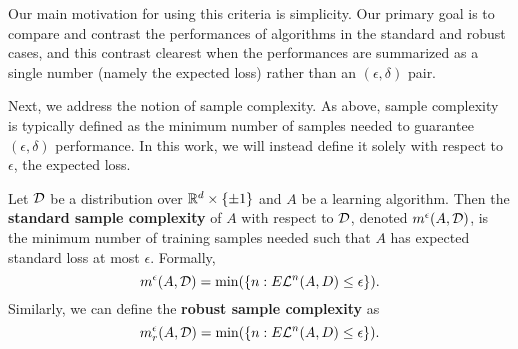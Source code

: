 Our main motivation for using this criteria is simplicity. Our primary goal is to compare and contrast the performances of algorithms in the standard and robust cases, and this contrast clearest when the performances are summarized as a single number (namely the expected loss) rather than an $(\epsilon, \delta)$ pair. 

Next, we address the notion of sample complexity. As above, sample complexity is typically defined as the minimum number of samples needed to guarantee $(\epsilon, \delta)$ performance. In this work, we will instead define it solely with respect to $\epsilon$, the expected loss. 

\begin{defn}
Let ${\mathcal D}$ be a distribution over $\mathbb R^d \times \{\pm 1\}$ and $A$ be a learning algorithm. Then the \textbf{standard sample complexity} of $A$ with respect to ${\mathcal D}$, denoted $m^\epsilon(A, {\mathcal D})$, is the minimum number of training samples needed such that $A$ has  expected standard loss at most $\epsilon$. Formally, $$m^\epsilon(A, {\mathcal D}) = \min(\{n: E\mathcal L^n(A, D) \leq \epsilon\}).$$ Similarly, we can define the \textbf{robust sample complexity} as $$m_r^\epsilon(A, {\mathcal D}) = \min(\{n: E\mathcal L^n(A, D) \leq \epsilon\}).$$
\end{defn}



%
%
%
%
%
%
%